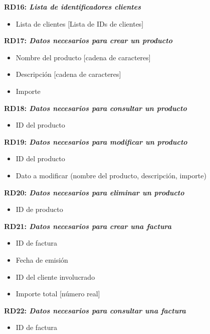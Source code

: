 \documentclass[paper=a4, fontsize=11pt, spanish]{scrartcl}
\begin{document}
\setlength{\parindent}{0em}
\textbf{RD16: \textit{Lista de identificadores clientes}}
\setlength{\parindent}{2em}
\begin{itemize}
\item Lista de clientes [Lista de IDs de clientes]
\end{itemize}

\setlength{\parindent}{0em}
	\textbf{RD17: \textit{Datos necesarios para crear un producto}}
	\setlength{\parindent}{2em}
	\begin{itemize}
		\item Nombre del producto [cadena de caracteres]
		\item Descripción [cadena de caracteres]
		\item Importe
	\end{itemize}
	
	\setlength{\parindent}{0em}
	\textbf{RD18: \textit{Datos necesarios para consultar un producto}}
	\setlength{\parindent}{2em}
	\begin{itemize}
		\item ID del producto
	\end{itemize}
	
	\setlength{\parindent}{0em}
	\textbf{RD19: \textit{Datos necesarios para modificar un producto}}
	\setlength{\parindent}{2em}
	\begin{itemize}
		\item ID del producto
		\item Dato a modificar (nombre del producto, descripción, importe)
	\end{itemize}
	
	\setlength{\parindent}{0em}
	\textbf{RD20: \textit{Datos necesarios para eliminar un producto}}
	\setlength{\parindent}{2em}
	\begin{itemize}
		\item ID de producto
	\end{itemize}
	
	\setlength{\parindent}{0em}
	\textbf{RD21: \textit{Datos necesarios para crear una factura}}
	\setlength{\parindent}{2em}
	\begin{itemize}
		\item ID de factura
		\item Fecha de emisión 
		\item ID del cliente involucrado
		\item Importe total [número real]
	\end{itemize}
	
	\setlength{\parindent}{0em}
	\textbf{RD22: \textit{Datos necesarios para consultar una factura}}
	\setlength{\parindent}{2em}
	\begin{itemize}
		\item ID de factura
	\end{itemize}
	
\end{document}
